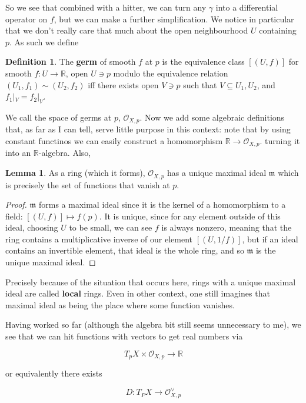 \documentclass{article}
\theoremstyle{definition}
\newtheorem{definition}{Definition}
\newtheorem{lemma}{Lemma}
\begin{document}
So we see that combined with a hitter, we can turn any $\gamma$ into a
differential operator on $f$, but we can make a further simplification. We
notice in particular that we don't really care that much about the open
neighbourhood $U$ containing $p$. As such we define

\begin{definition}
The \textbf{germ} of smooth $f$ at $p$ is the equivalence class $[(U, f)]$ for
smooth $f: U \to \mathbb{R}$, open $U \ni p$ modulo the equivalence relation
$(U_1, f_1) \sim (U_2, f_2)$ iff there exists open $V \ni p$ such that $V
\subseteq U_1, U_2$, and $f_1 |_V = f_2 |_V$.
\end{definition}

We call the space of germs at $p$, $\mathcal{O}_{X, p}$. Now we add some
algebraic definitions that, as far as I can tell, serve little purpose in this
context: note that by using constant functinos we can easily construct a
homomorphism $\mathbb{R} \to \mathcal{O}_{X, p}$. turning it into an
$\mathbb{R}$-algebra. Also,

\begin{lemma}
As a ring (which it forms), $\mathcal{O}_{X, p}$ has
a unique maximal ideal $\mathfrak{m}$ which is precisely the set of functions
that vanish at $p$. 
\end{lemma}
\begin{proof}
$\mathfrak{m}$ forms a maximal ideal since it is the kernel of a homomorphism to
a field: $[(U, f)] \mapsto f(p)$. It is unique, since for any element outside of
this ideal, choosing $U$ to be small, we can see $f$ is always nonzero, meaning
that the ring contains a multiplicative inverse of our element $[(U, 1/f)]$, but
if an ideal contains an invertible element, that ideal is the whole ring, and so
$\mathfrak{m}$ is the unique maximal ideal.
\end{proof}

Precisely because of the situation that occurs here, rings with a unique maximal
ideal are called \textbf{local} rings. Even in other context, one still imagines
that maximal ideal as being the place where some function vanishes. 

Having worked so far (although the algebra bit still seems unnecessary to me),
we see that we can hit functions with vectors to get real numbers via

$$ T_pX \times \mathcal{O}_{X, p} \to \mathbb{R} $$

or equivalently there exists 

$$ D: T_PX \to \mathcal{O}^\vee_{X, p} $$
\end{document}
